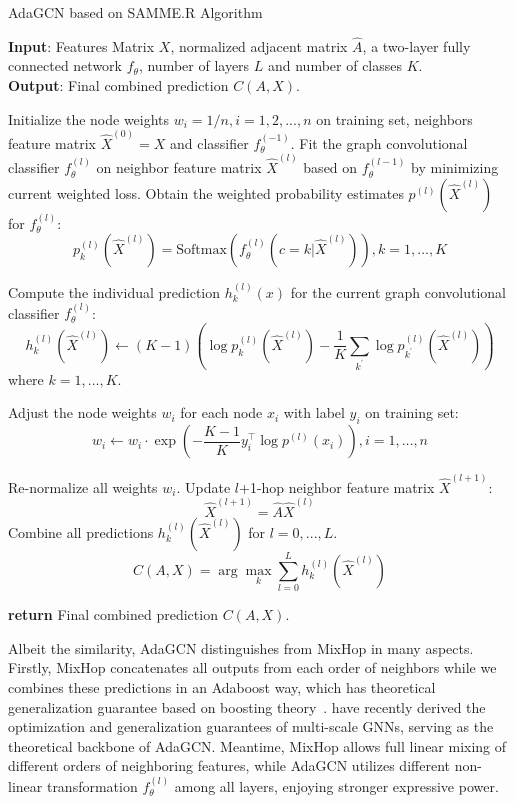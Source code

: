 \documentclass{article} \usepackage{iclr2021_conference,times}
\begin{document}
\begin{algorithm}[t!]
	\caption{AdaGCN based on SAMME.R Algorithm}
	\textbf{Input}: Features Matrix $X$, normalized adjacent matrix $\hat{A}$, a two-layer fully connected network $f_{\theta}$, number of layers $L$ and number of classes $K$.\\
	
	\textbf{Output}: Final combined prediction $C(A, X)$.
	
	\begin{algorithmic}[1] \STATE Initialize the node weights $w_i = 1/n, i = 1,2,...,n$ on training set, neighbors feature matrix $\hat{X}^{(0)}=X$ and classifier $f_{\theta}^{(-1)}$. 
		\STATE Fit the graph convolutional classifier $f_{\theta}^{(l)}$ on neighbor feature matrix $\hat{X}^{(l)}$ based on $f_{\theta}^{(l-1)}$ by minimizing current weighted loss.
		\STATE Obtain the weighted probability estimates $p^{(l)}(\hat{X}^{(l)})$ for $f_{\theta}^{(l)}$:
		$$p_{k}^{(l)}(\hat{X}^{(l)})=\text{Softmax}(f_{\theta}^{(l)}(c=k | \hat{X}^{(l)})), k=1, \ldots, K$$
		
		\STATE Compute the individual prediction $h_{k}^{(l)}(x)$ for the current graph convolutional classifier $f_{\theta}^{(l)}$:
		$$h_{k}^{(l)}(\hat{X}^{(l)}) \leftarrow(K-1)\left(\log p_{k}^{(l)}(\hat{X}^{(l)})-\frac{1}{K} \sum_{k^{\prime}} \log p_{k^{\prime}}^{(l)}(\hat{X}^{(l)})\right)$$
		where $k=1, \ldots, K$.
		
		\STATE Adjust the node weights $w_i$ for each node $x_i$ with label $y_{i}$ on training set:
		$$w_{i} \leftarrow w_{i} \cdot \exp \left(-\frac{K-1}{K} y_{i}^{\top} \log p^{(l)}\left(x_{i}\right)\right), i=1, \ldots, n$$
		
		\STATE Re-normalize all weights $w_i$.
		\STATE Update $l$+1-hop neighbor feature matrix $\hat{X}^{(l+1)}$:
		$$\hat{X}^{(l+1)}=\hat{A} \hat{X}^{(l)}$$
		\ENDFOR
		\STATE Combine all predictions $h_{k}^{(l)}(\hat{X}^{(l)})$ for $l=0,...,L$.
		$$C(A, X)=\arg \max _{k} \sum_{l=0}^{L} h_{k}^{(l)}(\hat{X}^{(l)})$$
		
		\STATE \textbf{return} Final combined prediction $C(A, X)$.
	\end{algorithmic}
	\label{alg:adagcn}
\end{algorithm}


Albeit the similarity, AdaGCN distinguishes from MixHop in many aspects. Firstly, MixHop concatenates all outputs from each order of neighbors while we combines these predictions in an Adaboost way, which has theoretical generalization guarantee based on boosting theory~\cite{hastie2009multi}. \cite{oono2020optimization} have recently derived the optimization and generalization guarantees of multi-scale GNNs, serving as the theoretical backbone of AdaGCN. Meantime, MixHop allows full linear mixing of different orders of neighboring features, while AdaGCN utilizes different non-linear transformation $f_{\theta}^{(l)}$ among all layers, enjoying stronger expressive power.
\end{document}
